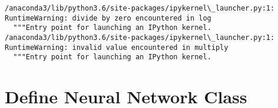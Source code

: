 \documentclass[11pt]{article}
\begin{document}
    \begin{Verbatim}[commandchars=\\\{\}]
/anaconda3/lib/python3.6/site-packages/ipykernel\_launcher.py:1: RuntimeWarning: divide by zero encountered in log
  """Entry point for launching an IPython kernel.
/anaconda3/lib/python3.6/site-packages/ipykernel\_launcher.py:1: RuntimeWarning: invalid value encountered in multiply
  """Entry point for launching an IPython kernel.

    \end{Verbatim}

    \section{Define Neural Network Class}\label{define-neural-network-class}
\end{document}
